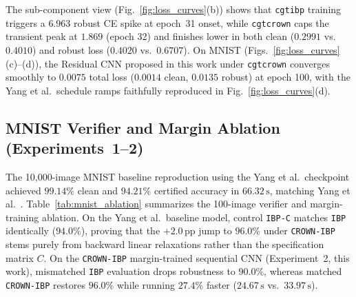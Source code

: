\documentclass[conference]{IEEEtran}
\begin{document}
The sub-component view (Fig.~\ref{fig:loss_curves}(b)) shows that
\texttt{cgtibp} training triggers a $6.963$ robust CE spike at epoch~31
onset, while \texttt{cgtcrown} caps the transient peak at $1.869$
(epoch 32) and finishes lower in both clean ($0.2991$ vs.\ $0.4010$) and
robust loss ($0.4020$ vs.\ $0.6707$).
On MNIST (Figs.~\ref{fig:loss_curves}(c)--(d)), the Residual CNN proposed
in this work under \texttt{cgtcrown} converges smoothly to $0.0075$ total
loss ($0.0014$ clean, $0.0135$ robust) at epoch 100, with the Yang
et al.\ schedule ramps faithfully reproduced in Fig.~\ref{fig:loss_curves}(d).

\subsection{MNIST Verifier and Margin Ablation (Experiments~1--2)}
The 10,000-image MNIST baseline reproduction using the Yang et al.\ checkpoint
achieved $99.14\%$ clean and $94.21\%$ certified accuracy in $66.32\,\text{s}$,
matching Yang et al.~\cite{b3}.
Table~\ref{tab:mnist_ablation} summarizes the 100-image verifier and
margin-training ablation.
On the Yang et al.\ baseline model, control \texttt{IBP-C} matches
\texttt{IBP} identically ($94.0\%$), proving that the $+2.0\,\text{pp}$
jump to $96.0\%$ under \texttt{CROWN-IBP} stems purely from backward linear
relaxations rather than the specification matrix $C$.
On the \texttt{CROWN-IBP} margin-trained sequential CNN (Experiment~2,
this work), mismatched \texttt{IBP} evaluation drops robustness to
$90.0\%$, whereas matched \texttt{CROWN-IBP} restores $96.0\%$ while
running $27.4\%$ faster ($24.67\,\text{s}$ vs.\ $33.97\,\text{s}$).
\end{document}
